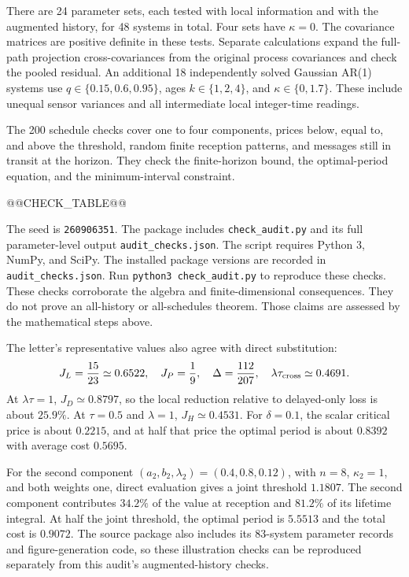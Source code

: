 \documentclass[11pt,letterpaper]{article}
\begin{document}
There are 24 parameter sets, each tested with local information and with the augmented history, for 48 systems in total. Four sets have $\kappa=0$. The covariance matrices are positive definite in these tests. Separate calculations expand the full-path projection cross-covariances from the original process covariances and check the pooled residual. An additional 18 independently solved Gaussian AR(1) systems use $q\in\{0.15,0.6,0.95\}$, ages $k\in\{1,2,4\}$, and $\kappa\in\{0,1.7\}$. These include unequal sensor variances and all intermediate local integer-time readings.

The 200 schedule checks cover one to four components, prices below, equal to, and above the threshold, random finite reception patterns, and messages still in transit at the horizon. They check the finite-horizon bound, the optimal-period equation, and the minimum-interval constraint.

{\small @@CHECK_TABLE@@}

The seed is \texttt{260906351}. The package includes \texttt{check\_audit.py} and its full parameter-level output \texttt{audit\_checks.json}. The script requires Python 3, NumPy, and SciPy. The installed package versions are recorded in \texttt{audit\_checks.json}. Run \texttt{python3 check\_audit.py} to reproduce these checks.
These checks corroborate the algebra and finite-dimensional consequences. They do not prove an all-history or all-schedules theorem. Those claims are assessed by the mathematical steps above.

The letter's representative values also agree with direct substitution:
\[
J_L=\frac{15}{23}\simeq0.6522,\quad J_P=\frac19,
\quad\Delta=\frac{112}{207},\quad
\lambda\tau_{\rm cross}\simeq0.4691.
\]
At $\lambda\tau=1$, $J_D\simeq0.8797$, so the local reduction relative to delayed-only loss is about $25.9\%$. At $\tau=0.5$ and $\lambda=1$, $J_H\simeq0.4531$. For $\delta=0.1$, the scalar critical price is about $0.2215$, and at half that price the optimal period is about $0.8392$ with average cost $0.5695$.

For the second component $(a_2,b_2,\lambda_2)=(0.4,0.8,0.12)$, with $n=8$, $\kappa_2=1$, and both weights one, direct evaluation gives a joint threshold $1.1807$. The second component contributes $34.2\%$ of the value at reception and $81.2\%$ of its lifetime integral. At half the joint threshold, the optimal period is $5.5513$ and the total cost is $0.9072$. The source package also includes its 83-system parameter records and figure-generation code, so these illustration checks can be reproduced separately from this audit's augmented-history checks.
\end{document}
